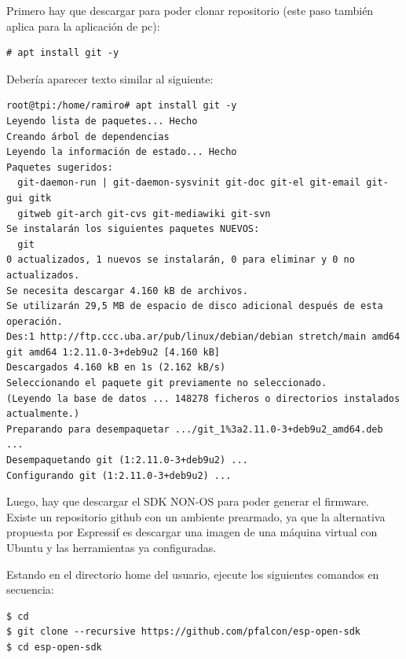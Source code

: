 Primero hay que descargar  para poder clonar repositorio (este paso también aplica para la aplicación de pc):
\begin{lstlisting}
# apt install git -y
\end{lstlisting}
Debería aparecer texto similar al siguiente:
\begin{lstlisting}
root@tpi:/home/ramiro# apt install git -y
Leyendo lista de paquetes... Hecho
Creando árbol de dependencias       
Leyendo la información de estado... Hecho
Paquetes sugeridos:
  git-daemon-run | git-daemon-sysvinit git-doc git-el git-email git-gui gitk
  gitweb git-arch git-cvs git-mediawiki git-svn
Se instalarán los siguientes paquetes NUEVOS:
  git
0 actualizados, 1 nuevos se instalarán, 0 para eliminar y 0 no actualizados.
Se necesita descargar 4.160 kB de archivos.
Se utilizarán 29,5 MB de espacio de disco adicional después de esta operación.
Des:1 http://ftp.ccc.uba.ar/pub/linux/debian/debian stretch/main amd64 git amd64 1:2.11.0-3+deb9u2 [4.160 kB]
Descargados 4.160 kB en 1s (2.162 kB/s)
Seleccionando el paquete git previamente no seleccionado.
(Leyendo la base de datos ... 148278 ficheros o directorios instalados actualmente.)
Preparando para desempaquetar .../git_1%3a2.11.0-3+deb9u2_amd64.deb ...
Desempaquetando git (1:2.11.0-3+deb9u2) ...
Configurando git (1:2.11.0-3+deb9u2) ...
\end{lstlisting}

Luego, hay que descargar el SDK NON-OS para poder generar el firmware. Existe un repositorio github con un ambiente prearmado, ya que la alternativa propuesta por Espressif es descargar una imagen de una máquina virtual con Ubuntu y las herramientas ya configuradas.

Estando en el directorio home del usuario, ejecute los siguientes comandos en secuencia:
\begin{lstlisting}
$ cd
$ git clone --recursive https://github.com/pfalcon/esp-open-sdk
$ cd esp-open-sdk
\end{lstlisting}


